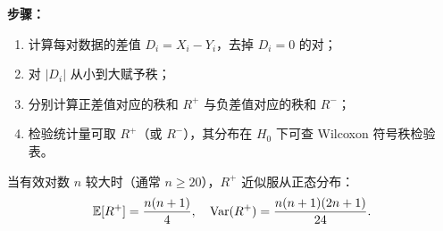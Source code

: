 \textbf{步骤：}
\begin{enumerate}
    \item 计算每对数据的差值 $D_i = X_i - Y_i$，去掉 $D_i = 0$ 的对；
    \item 对 $|D_i|$ 从小到大赋予秩；
    \item 分别计算正差值对应的秩和 $R^+$ 与负差值对应的秩和 $R^-$；
    \item 检验统计量可取 $R^+$（或 $R^-$），其分布在 $H_0$ 下可查 Wilcoxon 符号秩检验表。
\end{enumerate}

当有效对数 $n$ 较大时（通常 $n \ge 20$），$R^+$ 近似服从正态分布：
\begin{equation}
    \mathbb{E}[R^+] = \frac{n(n+1)}{4},\quad
    \mathrm{Var}(R^+) = \frac{n(n+1)(2n+1)}{24}.
\end{equation}

